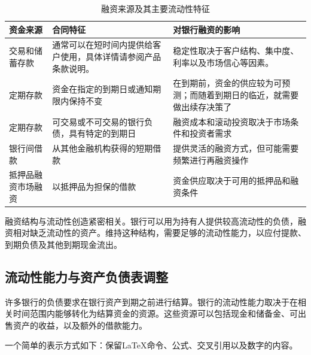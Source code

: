 \begin{table}[H]

\centering

\caption{融资来源及其主要流动性特征}

\label{tab:ch12-bank-funding-characteristics}

\begin{tabularx}{0.92\textwidth}{@{}p{} X X@{}}

\toprule

\textbf{资金来源} &
\textbf{合同特征} &
\textbf{对银行融资的影响} \\

\midrule

交易和储蓄存款&通常可以在短时间内提供给客户使用，具体详情请参阅产品条款说明。&稳定性取决于客户结构、集中度、利率以及市场信心等因素。\\

定期存款 &  
资金在指定的到期日或通知期限内保持不变 &  
在到期前，资金的供应较为可预测；而随着到期日的临近，就需要做出续存决策了 \\

定期存款 &  
可交易或不可交易的银行负债，具有特定的到期日 &  
融资成本和滚动投资取决于市场条件和投资者需求 \\

银行间借款 &
从其他金融机构获得的短期借款 &
提供灵活的融资方式，但可能需要频繁进行再融资操作 \\

抵押品融资市场融资 &
以抵押品为担保的借款 &
资金供应取决于可用的抵押品和融资条件 \\

\bottomrule

\end{tabularx}

\end{table}

融资结构与流动性创造紧密相关。银行可以用为持有人提供较高流动性的负债，融资相对缺乏流动性的资产。维持这种结构，需要足够的流动性能力，以应付提款、到期负债及其他到期现金流出。

\subsection{流动性能力与资产负债表调整}

许多银行的负债要求在银行资产到期之前进行结算。银行的流动性能力取决于在相关时间范围内能够转化为结算资金的资源。这些资源可以包括现金和储备金、可出售资产的收益，以及额外的借款能力。

一个简单的表示方式如下：保留LaTeX命令、公式、交叉引用以及数字的内容。

